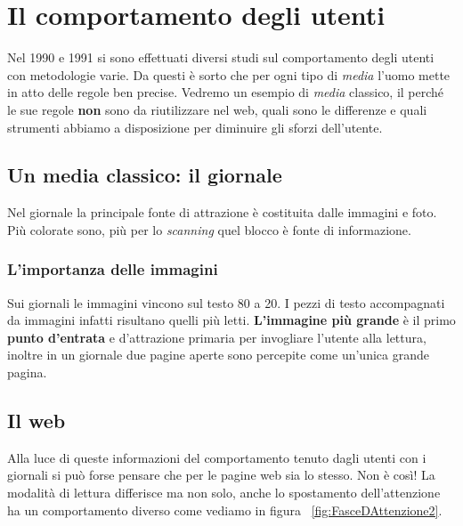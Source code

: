 
\chapter{Il comportamento degli utenti}

	Nel 1990 e 1991 si sono effettuati diversi studi sul comportamento degli utenti con metodologie varie. Da questi è sorto che per ogni tipo di \emph{media} l'uomo mette in atto delle regole ben precise. 
	Vedremo un esempio di \emph{media} classico, il perché le sue regole \textbf{non} sono da riutilizzare nel web, quali sono le differenze e quali strumenti abbiamo a disposizione per diminuire gli sforzi dell'utente.
	
	\section{Un media classico: il giornale}
	
		Nel giornale la principale fonte di attrazione è costituita dalle immagini e foto. Più colorate sono, più per lo \emph{scanning} quel blocco è fonte di informazione.
		
		\subsection{L'importanza delle immagini}
		
			Sui giornali le immagini vincono sul testo 80 a 20. I pezzi di testo accompagnati da immagini infatti risultano quelli più letti. \textbf{L'immagine più grande} è il primo \textbf{punto d'entrata} e d'attrazione primaria per invogliare l'utente alla lettura, inoltre in un giornale due pagine aperte sono percepite come un'unica grande pagina.
		
	\section{Il web}
	
		Alla luce di queste informazioni del comportamento tenuto dagli utenti con i giornali si può forse pensare che per le pagine web sia lo stesso. Non è così! La modalità di lettura differisce ma non solo, anche lo spostamento dell'attenzione ha un comportamento diverso come vediamo in figura ~\ref{fig:FasceDAttenzione2}.
		
